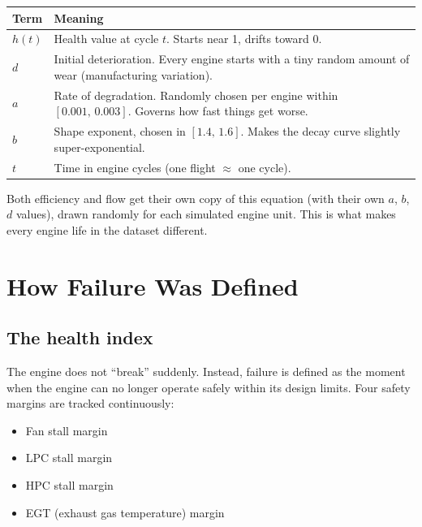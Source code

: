 \documentclass[11pt, a4paper]{article}
\begin{document}
\begin{center}
\begin{tabular}{@{}lp{9cm}@{}}
  \toprule
  Term & Meaning \\
  \midrule
  $h(t)$   & Health value at cycle $t$. Starts near 1, drifts toward 0. \\
  $d$      & Initial deterioration. Every engine starts with a tiny
             random amount of wear (manufacturing variation). \\
  $a$      & Rate of degradation. Randomly chosen per engine within
             $[0.001,\, 0.003]$. Governs how fast things get worse. \\
  $b$      & Shape exponent, chosen in $[1.4,\, 1.6]$.
             Makes the decay curve slightly super-exponential. \\
  $t$      & Time in engine cycles (one flight $\approx$ one cycle). \\
  \bottomrule
\end{tabular}
\end{center}

\medskip
Both efficiency and flow get their own copy of this equation (with their
own $a$, $b$, $d$ values), drawn randomly for each simulated engine unit.
This is what makes every engine life in the dataset different.

\section{How Failure Was Defined}

\subsection{The health index}

The engine does not ``break'' suddenly. Instead, failure is defined as
the moment when the engine can no longer operate safely within its
design limits. Four safety margins are tracked continuously:

\begin{itemize}[noitemsep]
  \item Fan stall margin
  \item LPC stall margin
  \item HPC stall margin
  \item EGT (exhaust gas temperature) margin
\end{itemize}
\end{document}
